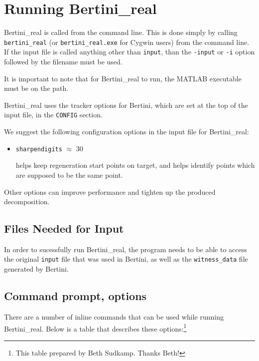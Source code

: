 
\section{Running Bertini\_real}
\label{sec:running_br}

Bertini\_real is called from the command line.   This is done simply by calling \texttt{bertini\_real} (or \texttt{bertini\_real.exe} for Cygwin users) from the command line. If the input file is called anything other than \texttt{input}, than the \texttt{-input} or \texttt{-i} option followed by the filename must be used.

It is important to note that for Bertini\_real to run, the MATLAB executable must be on the path.


Bertini\_real uses the tracker options for Bertini, which are set at the top of the input file, in the {\tt CONFIG} section.

We suggest the following configuration options in the input file for Bertini\_real:
\begin{itemize}
\item {\tt sharpendigits} $\approx$ 30

helps keep regeneration start points on target, and helps identify points which are supposed to be the same point.
\end{itemize}


Other options can improve performance and tighten up the produced decomposition.


\subsection{Files Needed for Input}
In order to sucessfully run Bertini\_real, the program needs to be able to access the original \texttt{input} file that was used in Bertini, as well as the \texttt{witness\_data} file generated by Bertini.


\subsection{Command prompt, options}
There are a number of inline commands that can be used while running Bertini\_real. Below is a table that describes these options:\footnote{This table prepared by Beth Sudkamp.  Thanks Beth!}

